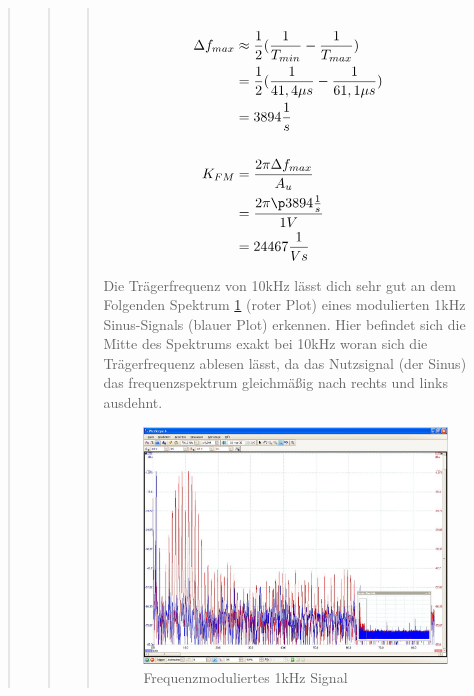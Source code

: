\begin{quote}
\begin{quote}
\begin{quote}
            
            \begin{equation*}
            \begin{split}
            \\
                \Delta f_{max} &\approx \frac{1}{2} (\frac{1}{T_{min}} - \frac{1}{T_{max}})\\
                               &= \frac{1}{2} (\frac{1}{41,4 \mu s} -\frac{1}{61,1 \mu s})\\
                               &= 3894 \frac{1}{s}\\
            \\
                K_{FM} &=\frac{2 \pi \Delta f_{max}}{A_u}\\
                       &= \frac{2 \pi \p 3894 \frac{1}{s}}{1V}\\
                       &= 24467 \frac{1}{Vs}
            \\
            \end{split}
            \end{equation*}
            \label{equ:}
            
            Die Trägerfrequenz von \si{10}{kHz} lässt dich sehr gut an dem Folgenden Spektrum \ref{fig:freq_1k} (roter Plot)
            eines modulierten \si{1}{kHz} Sinus-Signals (blauer Plot) erkennen. Hier befindet sich die Mitte des Spektrums exakt bei
            \si{10}{kHz} woran sich die Trägerfrequenz ablesen lässt, da das Nutzsignal (der Sinus) das frequenzspektrum
            gleichmäßig nach rechts und links ausdehnt.
            
            \begin{figure}[H]
            \centering
                \includegraphics[scale=0.5, trim = 0.25cm 1.3cm 1cm 3.2cm, clip]{Bilder/freq_1k}
                    \caption{Frequenzmoduliertes 1kHz Signal}
                    \label{fig:freq_1k}
            \end{figure}
            

\end{quote}
\end{quote}
\end{quote}
